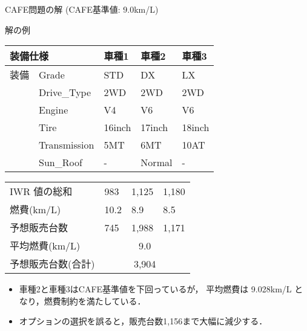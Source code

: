 \documentclass[dvipdfmx, 11pt]{beamer}
\begin{document}
\begin{frame}{CAFE問題の解 {\normalsize (CAFE基準値: 9.0km/L)}}\small
 \begin{exampleblock}{解の例}
  \centering
  \renewcommand{\arraystretch}{0.9}
  \begin{tabular}{p{10mm}|p{25mm}|p{15mm}|p{15mm}|p{15mm}} 
    \multicolumn{2}{l|}{装備仕様}  & 車種1 & 車種2 & 車種3 \\\hline
    装備 & \textsf{Grade}  & \textsf{STD}    & \textsf{DX}     & \textsf{LX}\\
    &\textsf{Drive\_Type}  & \textsf{2WD}    & \textsf{2WD}    & \textsf{2WD}\\
    &\textsf{Engine}	   & \textsf{V4}     & \textsf{V6}     & \textsf{V6}\\
    &\textsf{Tire}	   & \textsf{16inch} & \textsf{17inch} & \textsf{18inch}\\
    &\textsf{Transmission} & \textsf{5MT}    & \textsf{6MT}    & \textsf{10AT}\\
    &\textsf{Sun\_Roof}    & -               & \textsf{Normal} & -  
  \end{tabular}
 \end{exampleblock}
 \pause
 
 \begin{block}{}
  \centering
  \renewcommand{\arraystretch}{0.9}
  \begin{tabular}{p{38mm}|p{15mm}|p{15mm}|p{15mm}} 
     IWR 値の総和 & 983  & 1,125   & 1,180 \\ %
     燃費(km/L)      & 10.2  & 8.9     & 8.5 \\ %
     予想販売台数    & 745   & 1,988   & 1,171  \\ \hline
     平均燃費(km/L)  & \multicolumn{3}{c}{9.0} \\ 
     予想販売台数(合計)  & \multicolumn{3}{c}{3,904} \\ 
  \end{tabular}
  \end{block}
 \vfill
 \begin{itemize}
 \item 車種2と車種3はCAFE基準値を下回っているが，
   平均燃費は 9.028km/L となり，燃費制約を満たしている．
 \item オプションの選択を誤ると，販売台数1,156まで大幅に減少する．
 \end{itemize}
\end{frame}
\end{document}
